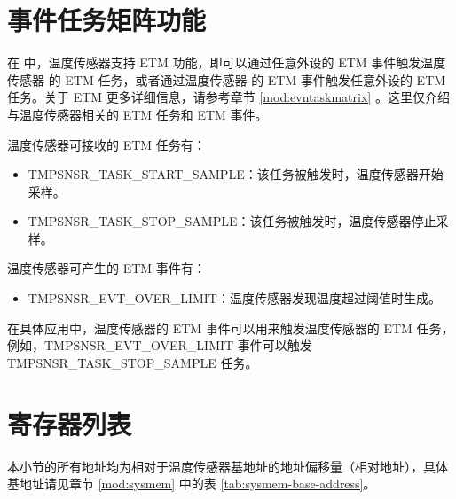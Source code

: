\documentclass[main\_\_CN.tex]{subfiles}
\begin{document}

\section{事件任务矩阵功能}
\label{sec:tmpsen-etm-func}

在 \chipname{} 中，温度传感器支持 ETM 功能，即可以通过任意外设的 ETM 事件触发温度传感器 的 ETM 任务，或者通过温度传感器 的 ETM 事件触发任意外设的 ETM 任务。关于 ETM 更多详细信息，请参考章节 \ref{mod:evntaskmatrix} 。这里仅介绍与温度传感器相关的 ETM 任务和 ETM 事件。

温度传感器可接收的 ETM 任务有：

\begin{itemize}
    \item TMPSNSR\_TASK\_START\_SAMPLE：该任务被触发时，温度传感器开始采样。
    \item TMPSNSR\_TASK\_STOP\_SAMPLE：该任务被触发时，温度传感器停止采样。
\end{itemize}

温度传感器可产生的 ETM 事件有：

\begin{itemize}
    \item TMPSNSR\_EVT\_OVER\_LIMIT：温度传感器发现温度超过阈值时生成。
\end{itemize}

在具体应用中，温度传感器的 ETM 事件可以用来触发温度传感器的 ETM 任务，例如，TMPSNSR\_EVT\_OVER\_LIMIT 事件可以触发 TMPSNSR\_TASK\_STOP\_SAMPLE 任务。





\clearpage
\hypertarget{tmpsen-reg-summ}{}
\section{寄存器列表}
\label{sec:tmpsen-reg-summ}

本小节的所有地址均为相对于温度传感器基地址的地址偏移量（相对地址），具体基地址请见章节 \ref{mod:sysmem} \textit{} 中的表 \ref{tab:sysmem-base-address}。
\end{document}
